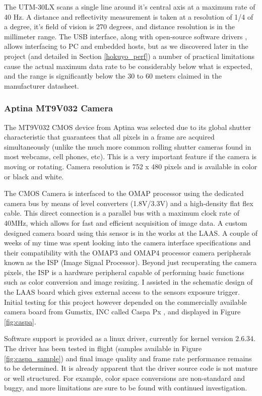 \documentclass[a4paper,11pt]{report}
\begin{document}
The UTM-30LX scans a single line around it's central axis at a maximum rate of 40 Hz. A distance and reflectivity measurement is taken at a resolution of 1/4 of a degree, it's field of vision is 270 degrees, and distance resolution is in the millimeter range. The USB interface, along with open-source software drivers \cite{robotpkg}, allows interfacing to PC and embedded hosts, but as we discovered later in the project (and detailed in Section \ref{hokuyo_perf}) a number of practical limitations cause the actual maximum data rate to be considerably below what is expected, and the range is significantly below the 30 to 60 meters claimed in the manufacturer datasheet.

\subsubsection{Aptina MT9V032 Camera}
\label{caspa}

The MT9V032 CMOS device from Aptina was selected due to its global shutter characteristic that guarantees that all pixels in a frame are acquired simultaneously (unlike the much more common rolling shutter cameras found in most webcams, cell phones, etc). This is a very important feature if the camera is moving or rotating. Camera resolution is 752 x 480 pixels and is available in color or black and white. 

The CMOS Camera is interfaced to the OMAP processor using the dedicated camera bus by means of level converters (1.8V/3.3V) and a high-density flat flex cable. This direct connection is a parallel bus with a maximum clock rate of 40MHz, which allows for fast and efficient acquisition of image data. A custom designed camera board using this sensor is in the works at the LAAS. A couple of weeks of my time was spent looking into the camera interface specifications and their compatibility with the OMAP3 and OMAP4 processor camera peripherals known as the ISP (Image Signal Processor). Beyond just recuperating the camera pixels, the ISP is a hardware peripheral capable of performing basic functions such as color conversion and image resizing. I assisted in the schematic design of the LAAS board which gives external access to the sensors exposure trigger. Initial testing for this project however depended on the commercially available camera board from Gumstix, INC called Caspa Px \cite{caspa}, and displayed in Figure \ref{fig:caspa}.

Software support is provided as a linux driver, currently for kernel version 2.6.34. The driver has been tested in flight (samples available in Figure \ref{fig:caspa_sample}) and final image quality and frame rate performance remains to be determined. It is already apparent that the driver source code is not mature or well structured. For example, color space conversions are non-standard and buggy, and more limitations are sure to be found with continued investigation.
\end{document}
